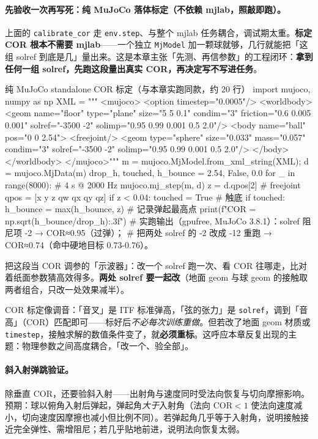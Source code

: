 \paragraph{先验收一次再写死：纯 MuJoCo 落体标定（不依赖 mjlab，照敲即跑）。}上面的 \verb|calibrate_cor| 走 \verb|env.step|、与整个 mjlab 任务耦合，调试期太重。\textbf{标定 COR 根本不需要 mjlab}——一个独立 \verb|MjModel| 加一颗球就够，几行就能把「这组 solref 到底是几」量出来。这是本章主张「先测、再信参数」的工程闭环：\textbf{拿到任何一组 solref，先跑这段量出真实 COR，再决定写不写进任务}。

\begin{codebox}[Python]{纯 MuJoCo standalone COR 标定（与本章实跑同款，约 20 行）}
import mujoco, numpy as np
XML = """
<mujoco>
  <option timestep="0.0005"/>
  <worldbody>
    <geom name="floor" type="plane" size="5 5 0.1" condim="3"
          friction="0.6 0.005 0.001" solref="-3500 -2" solimp="0.95 0.99 0.001 0.5 2.0"/>
    <body name="ball" pos="0 0 2.54">
      <freejoint/>
      <geom type="sphere" size="0.033" mass="0.057" condim="3"
            solref="-3500 -2" solimp="0.95 0.99 0.001 0.5 2.0"/>
    </body>
  </worldbody>
</mujoco>"""
m = mujoco.MjModel.from_xml_string(XML); d = mujoco.MjData(m)
drop_h, touched, h_bounce = 2.54, False, 0.0
for _ in range(8000):                       # 4 s @ 2000 Hz
    mujoco.mj_step(m, d)
    z = d.qpos[2]                            # freejoint qpos = [x y z qw qx qy qz]
    if z < 0.04: touched = True              # 触底
    if touched: h_bounce = max(h_bounce, z)  # 记录弹起最高点
print(f"COR = {np.sqrt(h_bounce/drop_h):.3f}")
# 实跑输出（gpufree, MuJoCo 3.8.1）：solref 阻尼项 -2 → COR≈0.95（过弹）；
#   把两处 solref 的 -2 改成 -12 重跑 → COR≈0.74（命中硬地目标 0.73-0.76）。
\end{codebox}

把这段当 COR 调参的「示波器」：改一个 solref 跑一次、看 COR 往哪走，比对着纸面参数猜高效得多。\textbf{两处 solref 要一起改}（地面 geom 与球 geom 的接触取两者组合，只改一处效果减半）。

\begin{insight}\label{ins:rlmc-tennis-cor}
COR 标定像调音：「音叉」是 ITF 标准弹高，「弦的张力」是 \verb|solref|，调到「音高」（COR）匹配即可——标好后\emph{不必每次训练重做}。但若改了地面 geom 材质或 \verb|timestep|，接触求解的数值条件变了，就\textbf{必须重标}。这呼应本章反复出现的主题：物理参数之间高度耦合，「改一个、验全部」。
\end{insight}

\paragraph{斜入射弹跳验证。}除垂直 COR，还要验斜入射——出射角与速度同时受法向恢复与切向摩擦影响。预期：球以俯角入射后弹起，弹起角\emph{大于}入射角（法向 COR$<1$ 使法向速度减小，切向速度因摩擦也减小但比例不同）。若弹起角几乎等于入射角，说明接触接近完全弹性、需增阻尼；若几乎贴地前进，说明法向恢复太弱。


